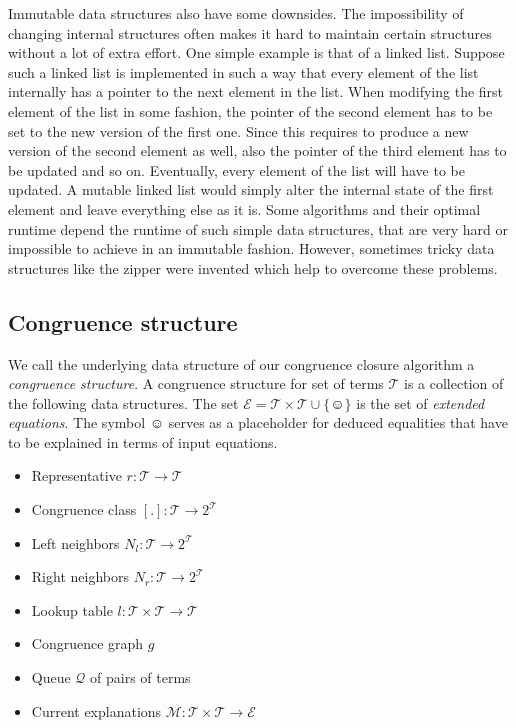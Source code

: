 Immutable data structures also have some downsides.
The impossibility of changing internal structures often makes it hard to maintain certain structures without a lot of extra effort.
One simple example is that of a linked list.
Suppose such a linked list is implemented in such a way that every element of the list internally has a pointer to the next element in the list.
When modifying the first element of the list in some fashion, the pointer of the second element has to be set to the new version of the first one.
Since this requires to produce a new version of the second element as well, also the pointer of the third element has to be updated and so on. 
Eventually, every element of the list will have to be updated.
A mutable linked list would simply alter the internal state of the first element and leave everything else as it is.
Some algorithms and their optimal runtime depend the runtime of such simple data structures, that are very hard or impossible to achieve in an immutable fashion.
However, sometimes tricky data structures like the zipper were invented which help to overcome these problems.

\subsection*{Congruence structure}

We call the underlying data structure of our congruence closure algorithm a \emph{congruence structure}.
A congruence structure for set of terms $\mathcal{T}$ is a collection of the following data structures.
The set $\mathcal{E} = \mathcal{T} \times \mathcal{T} \cup \{\smiley\}$ is the set of \emph{extended equations}.
The symbol $\smiley$ serves as a placeholder for deduced equalities that have to be explained in terms of input equations.

\begin{itemize}
	\item Representative $r: \mathcal{T} \rightarrow \mathcal{T}$
	\item Congruence class $[.]: \mathcal{T} \rightarrow 2^\mathcal{T}$
	\item Left neighbors $N_l: \mathcal{T} \rightarrow 2^\mathcal{T}$
	\item Right neighbors $N_r: \mathcal{T} \rightarrow 2^\mathcal{T}$
	\item Lookup table $l: \mathcal{T} \times \mathcal{T} \rightarrow \mathcal{T}$
	\item Congruence graph $g$
	\item Queue $\mathcal{Q}$ of pairs of terms
	\item Current explanations $\mathcal{M}: \mathcal{T} \times \mathcal{T} \rightarrow \mathcal{E}$
\end{itemize}


